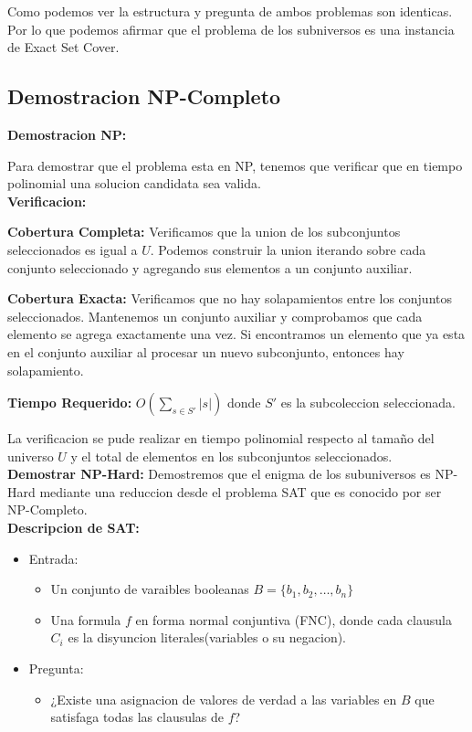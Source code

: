 \documentclass{article}
\begin{document}
Como podemos ver la estructura y pregunta de ambos problemas son identicas.
Por lo que podemos afirmar que el problema de los subniversos es una instancia de Exact Set Cover.


\subsection{Demostracion NP-Completo}

\textbf{Demostracion NP:}

Para demostrar que el problema esta en NP, tenemos que verificar que en tiempo polinomial una solucion candidata sea valida. \\

\textbf{Verificacion:}

\textbf{Cobertura Completa:} Verificamos que la union de los subconjuntos seleccionados es igual a \(U\). Podemos construir la union iterando sobre cada conjunto seleccionado y agregando sus elementos a un conjunto auxiliar.

\textbf{Cobertura Exacta:} Verificamos que no hay solapamientos entre los conjuntos seleccionados. Mantenemos un conjunto auxiliar y comprobamos que cada elemento se agrega exactamente una vez. Si encontramos un elemento que ya esta en el conjunto auxiliar al procesar un nuevo subconjunto, entonces hay solapamiento.

\textbf{Tiempo Requerido:} $O(\sum_{s\in S'} |s|)$ donde \(S'\) es la subcoleccion seleccionada.

La verificacion se pude realizar en tiempo polinomial respecto al tamaño del universo \(U\) y el total de elementos en los subconjuntos seleccionados.
\\

\textbf{Demostrar NP-Hard:}
 Demostremos que el enigma de los subuniversos es NP-Hard mediante una reduccion desde el problema SAT que es conocido por ser NP-Completo.
 \\

\textbf{Descripcion de SAT:}
\begin{itemize}
\item Entrada:
    \begin{itemize}
    \item Un conjunto de varaibles booleanas \(B = \)$\{b_1,b_2, \dots, b_n\}$
    \item Una formula \(f\) en forma normal conjuntiva (FNC), donde cada clausula $C_i$ es la disyuncion literales(variables o su negacion).
    \end{itemize}
\item Pregunta:
    \begin{itemize}
    \item ¿Existe una asignacion de valores de verdad a las variables en \(B\) que satisfaga todas las clausulas de \(f\)?
    \end{itemize}
\end{itemize}
\end{document}
